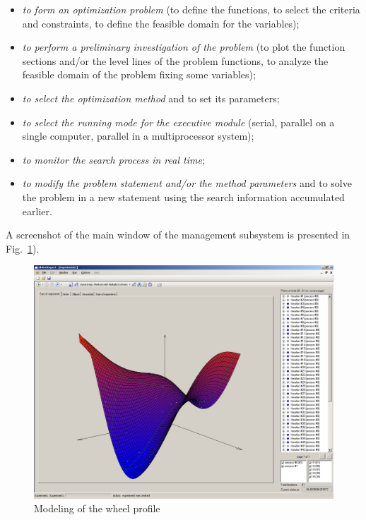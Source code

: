 \begin{itemize}
\item \textit{to form an optimization problem} (to define the functions, to select the criteria and constraints, to define the feasible domain for the variables);

\item \textit{to perform a preliminary investigation of the problem} (to plot the function sections and/or the level lines of the problem functions, to analyze the feasible domain of the problem fixing some variables);

\item \textit{to select the optimization method} and to set its parameters;

\item \textit{to select the running mode for the executive module} (serial, parallel on a single computer, parallel in a multiprocessor system);

\item \textit{to monitor the search process in real time};

\item \textit{to modify the problem statement and/or the method parameters} and to solve the problem in a new statement using the search information accumulated earlier.
\end{itemize}

A screenshot of the main window of the management subsystem is presented in Fig.~\ref{7_fig_3}).

\begin{figure}[t]
\includegraphics[width=1.0\linewidth]{figures/7_3.png}
\caption{Modeling of the wheel profile}
\label{7_fig_3}     
\end{figure}

